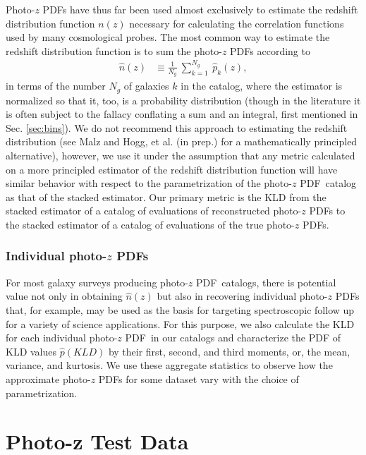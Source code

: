 \documentclass[\docopts]{\docclass}
\newcommand{\pz}{photo-$z$ PDF}
\newcommand{\Pz}{Photo-$z$ PDF}
\begin{document}
\Pz s have thus far been used almost exclusively to estimate the redshift
distribution function $n(z)$ necessary for calculating the correlation
functions used by many cosmological probes.  The most common way to estimate
the redshift distribution function is to sum the \pz s according to
\begin{align}
  \label{eq:nz}
  \hat{n}(z) &\equiv \frac{1}{N_{g}}\ \sum_{k=1}^{N_{g}}\ \hat{p}_{k}(z),
\end{align}
in terms of the number $N_{g}$ of galaxies $k$ in the catalog, where the
estimator is normalized so that it, too, is a probability distribution (though
in the literature it is often subject to the fallacy conflating a sum and an
integral, first mentioned in Sec. \ref{sec:bins}).  We do not recommend this
approach to estimating the redshift distribution (see Malz and Hogg, et al. (in
prep.) for a mathematically principled alternative), however, we use it under
the assumption that any metric calculated on a more principled estimator of the
redshift distribution function will have similar behavior with respect to the
parametrization of the \pz\ catalog as that of the stacked estimator.  Our
primary metric is the KLD from the stacked estimator of a catalog of
evaluations of reconstructed \pz s to the stacked estimator of a catalog of
evaluations of the true \pz s.

\subsubsection{Individual \pz s}
\label{sec:individual_metric}

For most galaxy surveys producing \pz\ catalogs, there is potential value not
only in obtaining $\hat{n}(z)$ but also in recovering individual \pz s that,
for example, may be used as the basis for targeting spectroscopic follow up for
a variety of science applications.  For this purpose, we also calculate the KLD
for each individual \pz\ in our catalogs and characterize the PDF of KLD values
$\hat{p}(KLD)$ by their first, second, and third moments, or, the mean,
variance, and kurtosis.  We use these aggregate statistics to observe how the
approximate \pz s for some dataset vary with the choice of parametrization.





\section{Photo-z Test Data}
\label{sec:data}
\end{document}

